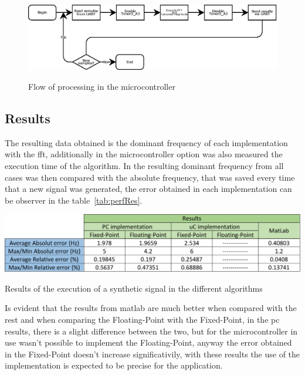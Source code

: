 \begin{figure}[]
    \centering
    \includegraphics[width=1\textwidth]{Chapters/6CHP/Figures/uCDataProc.eps}
    \caption{Flow of processing in the microcontroller}{}
    \label{fig:dataProcuC}
\end{figure}
\subsection{Results}
The resulting data obtained is the dominant frequency of each implementation with the \acrshort{fft}, additionally in the microcontroller option was also measured the execution time of the algorithm. In the resulting dominant frequency from all cases was then compared with the absolute frequency, that was saved every time that a new signal was generated, the error obtained in each implementation can be observer in the table~\ref{tab:perfRes}.
\begin{table}
    \centering
    \includegraphics[width=1\textwidth]{Chapters/6CHP/Figures/performanceAlgorithm.pdf}
    \caption{Results of the execution of a synthetic signal in the different algorithms}
    \label{tab:perfRes}
\end{table}
Is evident that the results from \acrshort{matlab} are much better when compared with the rest and when comparing the Floating-Point with the Fixed-Point, in the \acrshort{pc} results, there is a slight difference between the two, but for the microcontroller in use wasn't possible to implement the Floating-Point, anyway the error obtained in the Fixed-Point doesn't increase significativily, with these results the use of the implementation is expected to be precise for the application. 

